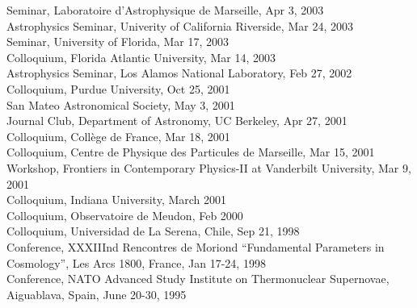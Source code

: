 \documentclass[line, margin]{res}
\begin{document}
\begin{resume}
Seminar, Laboratoire d'Astrophysique de Marseille, Apr 3, 2003\\
Astrophysics Seminar, Univerity of California Riverside, Mar 24, 2003\\
Seminar, University of Florida, Mar 17, 2003\\
Colloquium, Florida Atlantic University, Mar 14, 2003\\
Astrophysics Seminar, Los Alamos National Laboratory, Feb 27, 2002\\
Colloquium, Purdue University, Oct 25, 2001\\
San Mateo Astronomical Society, May 3, 2001\\
Journal Club, Department of Astronomy, UC Berkeley, Apr 27, 2001\\
Colloquium, Coll\`ege de France, Mar 18, 2001\\
Colloquium, Centre de Physique des Particules de Marseille, Mar 15, 2001\\
Workshop, Frontiers in Contemporary Physics-II at Vanderbilt University, Mar 9, 2001\\
Colloquium, Indiana University, March 2001\\
Colloquium, Observatoire de Meudon, Feb 2000\\
Colloquium, Universidad de La Serena,
Chile, Sep 21, 1998\\
Conference,  XXXIIInd
Rencontres de Moriond ``Fundamental Parameters in Cosmology'',
Les Arcs 1800, France, Jan 17-24, 1998\\
Conference, NATO Advanced Study Institute on Thermonuclear Supernovae, Aiguablava,
Spain, June 20-30, 1995\\


\end{resume}
\end{document}
